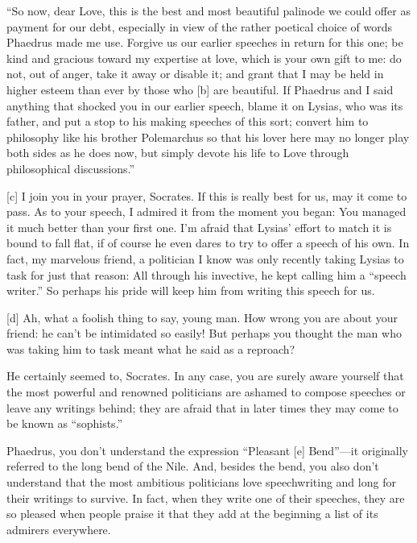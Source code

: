 “So now, dear Love, this is the best and most beautiful
palinode we could
offer as payment for our debt, especially in view of the rather poetical
choice of words Phaedrus made me
use. Forgive us our
earlier speeches in return for this one; be kind and gracious toward my
expertise at love, which is your own gift to me: do not, out of anger,
take it away or disable it; and grant that I may be held in higher
esteem than ever by those who {[}b{]} are beautiful. If Phaedrus and I
said anything that shocked you in our earlier speech, blame it on
Lysias, who was its father, and put a stop to his making speeches of
this sort; convert him to philosophy like his brother Polemarchus so
that his lover here may no longer play both sides as he does now, but
simply devote his life to Love through philosophical discussions.”

{[}c{]} \sayphaedrus I join you in your prayer, Socrates. If this is really
best for us, may it come to pass. As to your speech, I admired it from
the moment you began: You managed it much better than your first one.
I'm afraid that Lysias' effort to match it is bound to fall flat, if of
course he even dares to try to offer a speech of his own. In fact, my
marvelous friend, a politician I know was only recently taking Lysias to
task for just that reason: All through his invective, he kept calling
him a “speech writer.” So perhaps his pride will keep him from writing
this speech for us.

{[}d{]} \saysocrates Ah, what a foolish thing to say, young man. How wrong
you are about your friend: he can't be intimidated so easily! But
perhaps you thought the man who was taking him to task meant what he
said as a reproach?

\sayphaedrus He certainly seemed to, Socrates. In any case, you are surely
aware yourself that the most powerful and renowned politicians are
ashamed to compose speeches or leave any writings behind; they are
afraid that in later times they may come to be known as “sophists.”

\saysocrates Phaedrus, you don't understand the expression “Pleasant
{[}e{]} Bend”---it originally referred to the long bend of the
Nile. And, besides the
bend, you also don't understand that the most ambitious politicians love
speechwriting and long for their writings to survive. In fact, when they
write one of their speeches, they are so pleased when people praise it
that they add at the beginning a list of its admirers everywhere.

